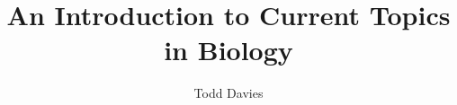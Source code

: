 \newcommand{\coursename}{An Introduction to Current Topics in Biology}
\newcommand{\coursecode}{UCOL20882}
\newcommand{\courseinfo}{}
\newcommand{\Author}{Todd Davies} 
\newcommand{\Title}{An Introduction to Current Topics in Biology}
\author{\Author}
\title{\Title}
